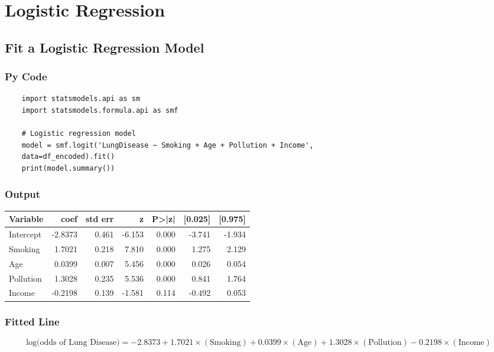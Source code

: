\documentclass[a4paper,12pt]{article}
\begin{document}
\section{Logistic Regression}

\subsection{Fit a Logistic Regression Model}

\subsubsection{Py Code}
\begin{lstlisting}
	import statsmodels.api as sm
	import statsmodels.formula.api as smf
	
	# Logistic regression model
	model = smf.logit('LungDisease ~ Smoking + Age + Pollution + Income',
	data=df_encoded).fit()
	print(model.summary())
\end{lstlisting}

\subsubsection{Output}
\begin{center}
	\begin{tabular}{|l|r|r|r|r|r|r|}
		\hline
		\textbf{Variable} & \textbf{coef} & \textbf{std err} & \textbf{z} & \textbf{P>|z|} & \textbf{[0.025]} & \textbf{[0.975]} \\
		\hline
		Intercept & -2.8373 & 0.461 & -6.153 & 0.000 & -3.741 & -1.934 \\
		Smoking & 1.7021 & 0.218 & 7.810 & 0.000 & 1.275 & 2.129 \\
		Age & 0.0399 & 0.007 & 5.456 & 0.000 & 0.026 & 0.054 \\
		Pollution & 1.3028 & 0.235 & 5.536 & 0.000 & 0.841 & 1.764 \\
		Income & -0.2198 & 0.139 & -1.581 & 0.114 & -0.492 & 0.053 \\
		\hline
	\end{tabular}
\end{center}

\subsubsection{Fitted Line}


\[
\text{log(odds of Lung Disease)} = -2.8373 + 1.7021 \times (\text{Smoking}) + 0.0399 \times (\text{Age}) + 1.3028 \times (\text{Pollution}) - 0.2198 \times (\text{Income})
\]
\end{document}
